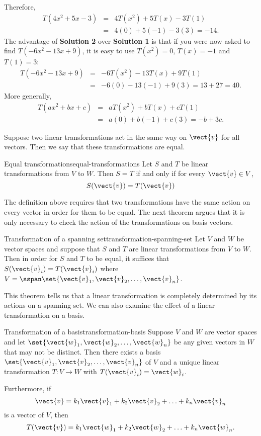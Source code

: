 \begin{solution}
Therefore,
\begin{eqnarray*}
T(4x^2+5x-3) & = & 4T(x^2) + 5T(x) -3T(1) \\
& = & 4(0) + 5(-1) - 3(3)=-14.
\end{eqnarray*}
The advantage of \textbf{Solution 2} over \textbf{Solution 1} is that
if you were now asked to find $T(-6x^2-13x+9)$, it is easy to
use $T(x^2)=0$, $T(x)=-1$ and $T(1)= 3$:
\begin{eqnarray*}
T(-6x^2-13x+9) & = & -6T(x^2)-13T(x)+9T(1) \\
& = & -6(0)-13(-1)+9(3)=13+27=40.
\end{eqnarray*}
More generally,
\begin{eqnarray*}
T(ax^2+bx+c) & = & aT(x^2)+bT(x)+cT(1) \\
& = & a(0)+b(-1)+c(3)=-b+3c.
\end{eqnarray*}
\end{solution}

Suppose two linear transformations act in the same way on $\vect{v}$ for all vectors. Then we say that these transformations are equal.

\begin{definition}{Equal transformations}{equal-transformations}
Let $S$ and $T$ be linear transformations from $V$ to $W$. Then $S = T$ if and only if for every $\vect{v} \in V$,
\[
S (\vect{v}) = T (\vect{v})
\]
\end{definition}

The definition above requires that two transformations have the same action on every vector in order for them to be equal. The next theorem argues that it is only necessary to check the action of the transformations on basis vectors.

\begin{theorem}{Transformation of a spanning set}{transformation-spanning-set}
Let $V$ and $W$ be vector spaces and suppose that $S$ and $T$ are linear transformations from $V$ to $W$. Then in order for $S$ and $T$ to be equal, it suffices that $S(\vect{v}_i) = T(\vect{v}_i)$ where $V=\sspan \set{\vect{v}_1, \vect{v}_2, \ldots, \vect{v}_n}$.
\end{theorem}

This theorem tells us that a linear transformation is completely
determined by its actions on a spanning set. We can also examine the effect of a linear transformation on a basis.

\begin{theorem}{Transformation of a basis}{transformation-basis}
Suppose $V$ and $W$ are vector spaces and let $\set{\vect{w}_1, \vect{w}_2, \ldots, \vect{w}_n}$ be any given vectors in $W$ that may not be distinct. Then there exists a basis $\set{\vect{v}_1, \vect{v}_2, \ldots, \vect{v}_n}$ of $V$ and a unique linear transformation $T: V \to W$ with $T (\vect{v}_i) = \vect{w}_i$.

Furthermore, if
\[ \vect{v} = k_1\vect{v}_1+k_2\vect{v}_2+\ldots+ k_n\vect{v}_n\]
is a vector of $V$, then
\[ T(\vect{v}) = k_1\vect{w}_1+k_2\vect{w}_2+\ldots+ k_n\vect{w}_n.\]
\end{theorem}

